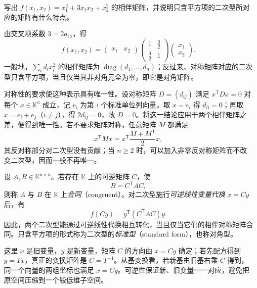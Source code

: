 \begin{example}
\label{ex:quadratic-matrix-representation}
写出 $f(x_1,x_2)=x_1^2+3x_1x_2+x_2^2$ 的相伴矩阵，并说明只含平方项的二次型所对应的矩阵有什么特点。
\end{example}
\begin{solve}
由交叉项系数 $3=2a_{12}$，得
\[
    f(x_1,x_2)
    =\begin{pmatrix}x_1&x_2\end{pmatrix}
    \begin{pmatrix}1&\frac32\\\frac32&1\end{pmatrix}
    \begin{pmatrix}x_1\\x_2\end{pmatrix}.
\]
一般地，$\sum_i d_ix_i^2$ 的相伴矩阵为 $\operatorname{diag}(d_1,\ldots,d_n)$；反过来，对称矩阵对应的二次型只含平方项，当且仅当其非对角元全为零，即它是对角矩阵。
\end{solve}

对称性的要求使这种表示具有唯一性。设对称矩阵 $D=(d_{ij})$ 满足 $x^{\mathsf T}Dx=0$ 对每个 $x\in\mathbb K^n$ 成立，记 $e_i$ 为第 $i$ 个标准单位列向量。取 $x=e_i$ 得 $d_{ii}=0$；再取 $x=e_i+e_j$（$i\ne j$），得 $2d_{ij}=0$，故 $D=0$。将这一结论应用于两个相伴矩阵之差，便得到唯一性。若不要求矩阵对称，任意矩阵 $M$ 都满足
\[
    x^{\mathsf T}Mx=x^{\mathsf T}\frac{M+M^{\mathsf T}}2x,
\]
其反对称部分对二次型没有贡献；当 $n\geq2$ 时，可以加入非零反对称矩阵而不改变二次型，因而一般不再唯一。

\begin{definition}
\label{def:matrix-congruence}
设 $A,B\in\mathbb K^{n\times n}$。若存在 $\mathbb K$ 上的可逆矩阵 $C$，使
\begin{equation}
\label{eq:matrix-congruence}
    B=C^{\mathsf T}AC,
\end{equation}
则称 $A$ 与 $B$ 在 $\mathbb K$ 上\emph{合同}（congruent）。对二次型施行\emph{可逆线性变量代换} $x=Cy$ 后，有
\begin{equation}
\label{eq:quadratic-coordinate-change}
    f(Cy)=y^{\mathsf T}(C^{\mathsf T}AC)y.
\end{equation}
因此，两个二次型能通过可逆线性代换相互转化，当且仅当它们的相伴对称矩阵合同。只含平方项的形式称为二次型的\emph{标准型}（standard form），也称对角型。
\end{definition}

这里 $x$ 是旧变量，$y$ 是新变量，矩阵 $C$ 的方向由 $x=Cy$ 确定；若先配方得到 $y=Tx$，真正的变换矩阵是 $C=T^{-1}$。从基变换看，若新基由旧基右乘 $C$ 得到，同一个向量的两组坐标也满足 $x=Cy$。可逆性保证新、旧变量一一对应，避免把原空间压缩到一个较低维子空间。

